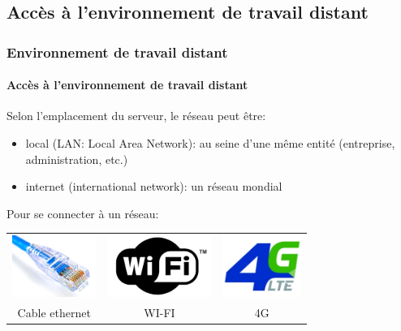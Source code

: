\documentclass{beamer}
\begin{document}
%
%

\subsection{Accès à l'environnement de travail distant}

\begin{frame}
\frametitle{Environnement de travail distant}
\framesubtitle{Accès à l'environnement de travail distant}

Selon l'emplacement du serveur, le réseau peut être:
\begin{itemize}
	\item local (LAN: Local Area Network): au seine d'une même entité (entreprise, administration, etc.)
	\item internet (international network): un réseau mondial
\end{itemize}

Pour se connecter à un réseau:

\begin{tabular}{ccc}
	\includegraphics[height=2cm]{../img/Bweb01-environnement/ethernet.jpg} &
	\includegraphics[height=2cm]{../img/Bweb01-environnement/wifi.png} &
	\includegraphics[height=2cm]{../img/Bweb01-environnement/4g.jpeg} \\
	
	Cable ethernet &
	WI-FI &
	4G \\
\end{tabular}

\end{frame}
\end{document}
